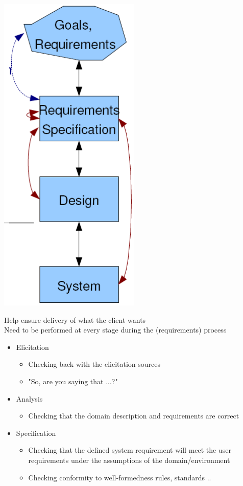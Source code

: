 \documentclass{article}[18pt]
\begin{document}
\begin{minipage}{0.2\textwidth}
	\includegraphics[scale=0.7]{validation}
\end{minipage}
Help ensure delivery of what the client wants\\
Need to be performed at every stage during the (requirements) process
\begin{itemize}
	\item Elicitation
	\begin{itemize}
		\item Checking back with the elicitation sources
		\item "So, are you saying that ...?"
	\end{itemize}
	\item Analysis
	\begin{itemize}
		\item Checking that the domain description and requirements are correct
	\end{itemize}
	\item Specification
	\begin{itemize}
		\item Checking that the defined system requirement will meet the user requirements under the assumptions of the domain/environment
		\item Checking conformity to well-formedness rules, standards ..
	\end{itemize}
\end{itemize}
\end{document}
